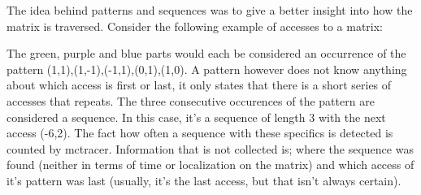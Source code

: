 The idea behind patterns and sequences was to give a better insight into how the matrix is traversed.\newline
Consider the following example of accesses to a matrix:\newline
{}\newline
The green, purple and blue parts would each be considered an occurrence of the pattern (1,1),(1,-1),(-1,1),(0,1),(1,0). A pattern however does not know anything about which access is first or last, it only states that there is a short series of accesses that repeats.\newline
The three consecutive occurences of the pattern are considered a sequence. In this case, it's a sequence of length 3 with the next access (-6,2). The fact how often a sequence with these specifics is detected is counted by mctracer. Information that is not collected is; where the sequence was found (neither in terms of time or localization on the matrix) and which access of it's pattern was last (usually, it's the last access, but that isn't always certain).
